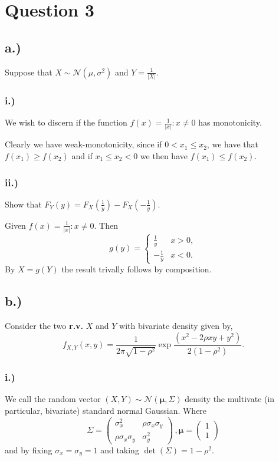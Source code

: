 
\section{Question 3} %
\label{sec:question3}

%
\subsection{a.)}
Suppose that $X \sim \mathcal{N}(\mu,\sigma^2)$ and $Y = \frac{1}{|X|}$.

%
\subsubsection{i.)}
We wish to discern if the function $f(x)= \frac{1}{|x|} : x \neq 0$ has
monotonicity.

Clearly we have weak-monotonicity, since if $0 < x_1 \leq x_2$, we have that
$f(x_1) \geq f(x_2)$ and if $x_1 \leq x_2 < 0$ we then have $f(x_1) \leq f(x_2)$.

%
\subsubsection{ii.)}
Show that $F_Y(y) = F_X(\frac{1}{y}) - F_X(-\frac{1}{y})$.


Given $f(x)=\frac{1}{|x|} : x \neq 0$. Then
\[
 g(y)=
 \begin{cases}
  \frac{1}{y} & x > 0, \\
  -\frac{1}{y} & x < 0.
 \end{cases}
\]
By $X=g(Y)$ the result trivally follows by composition.

%
\subsection{b.)}
Consider the two \textbf{r.v.} $X$ and $Y$ with bivariate density given by,
\[
 f_{X,Y}(x,y) = \frac{1}{2\pi \sqrt{1 - \rho^2}}
 \exp{ \frac{ (x^2 - 2 \rho x y + y^2) }{2(1-\rho^2)} }.
\]

%
\subsubsection{i.)}
We call the random vector $(X,Y) \sim \mathcal{N}(\boldsymbol{\mu},\Sigma)$
density the multivate (in particular, bivariate) standard normal Gaussian.
Where
\[
 \Sigma =
 \begin{pmatrix}
  \sigma_x^2 & \rho \sigma_x \sigma_y \\
  \rho \sigma_x \sigma_y & \sigma_y^2
 \end{pmatrix}
 \, ,
 \boldsymbol{\mu} =
 \begin{pmatrix}
  1 \\ 1
 \end{pmatrix}
\]
and by fixing $\sigma_x = \sigma_y = 1$ and taking $\det(\Sigma)=1-\rho^2$.
